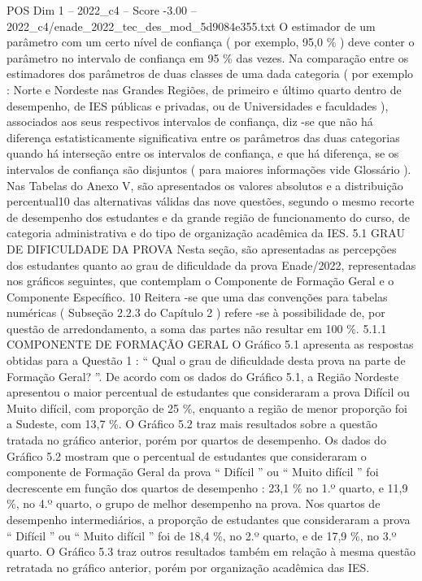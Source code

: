 \begin{textsample}{POS Dim 1 – 2022\_c4 – Score -3.00 – 2022\_c4/enade\_2022\_tec\_des\_mod\_5d9084e355.txt}
O estimador de um parâmetro com um certo nível de confiança ( por exemplo, 95,0 \% ) deve conter o parâmetro no intervalo de confiança em 95 \% das vezes.
Na comparação entre os estimadores dos parâmetros de duas classes de uma dada categoria ( por exemplo : Norte e Nordeste nas Grandes Regiões, de primeiro e último quarto dentro de desempenho, de IES públicas e privadas, ou de Universidades e faculdades ), associados aos seus respectivos intervalos de confiança, diz -se que não há diferença estatisticamente significativa entre os parâmetros das duas categorias quando há interseção entre os intervalos de confiança, e que há diferença, se os intervalos de confiança são disjuntos ( para maiores informações vide Glossário ).
Nas Tabelas do Anexo V, são apresentados os valores absolutos e a distribuição percentual10 das alternativas válidas das nove questões, segundo o mesmo recorte de desempenho dos estudantes e da grande região de funcionamento do curso, de categoria administrativa e do tipo de organização acadêmica da IES. 5.1 GRAU DE DIFICULDADE DA PROVA Nesta seção, são apresentadas as percepções dos estudantes quanto ao grau de dificuldade da prova Enade/2022, representadas nos gráficos seguintes, que contemplam o Componente de Formação Geral e o Componente Específico. 10 Reitera -se que uma das convenções para tabelas numéricas ( Subseção 2.2.3 do Capítulo 2 ) refere -se à possibilidade de, por questão de arredondamento, a soma das partes não resultar em 100 \%. 5.1.1 COMPONENTE DE FORMAÇÃO GERAL O Gráfico 5.1 apresenta as respostas obtidas para a Questão 1 : “ Qual o grau de dificuldade desta prova na parte de Formação Geral? ”.
De acordo com os dados do Gráfico 5.1, a Região Nordeste apresentou o maior percentual de estudantes que consideraram a prova Difícil ou Muito difícil, com proporção de 25 \%, enquanto a região de menor proporção foi a Sudeste, com 13,7 \%.
O Gráfico 5.2 traz mais resultados sobre a questão tratada no gráfico anterior, porém por quartos de desempenho.
Os dados do Gráfico 5.2 mostram que o percentual de estudantes que consideraram o componente de Formação Geral da prova “ Difícil ” ou “ Muito difícil ” foi decrescente em função dos quartos de desempenho : 23,1 \% no 1.º quarto, e 11,9 \%, no 4.º quarto, o grupo de melhor desempenho na prova.
Nos quartos de desempenho intermediários, a proporção de estudantes que consideraram a prova “ Difícil ” ou “ Muito difícil ” foi de 18,4 \%, no 2.º quarto, e de 17,9 \%, no 3.º quarto.
O Gráfico 5.3 traz outros resultados também em relação à mesma questão retratada no gráfico anterior, porém por organização acadêmica das IES.

\end{textsample}
